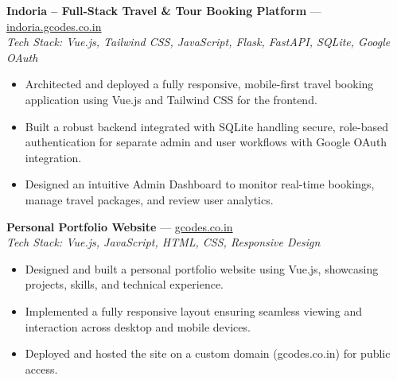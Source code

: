 \documentclass[10.5pt,a4paper]{article}
\begin{document}
\vspace{3pt}
\textbf{Indoria -- Full-Stack Travel \& Tour Booking Platform} --- \href{https://indoria.gcodes.co.in}{indoria.gcodes.co.in}\\
\textit{Tech Stack: Vue.js, Tailwind CSS, JavaScript, Flask, FastAPI, SQLite, Google OAuth}
\begin{itemize}[leftmargin=*, itemsep=1pt, topsep=1pt]
    \item Architected and deployed a fully responsive, mobile-first travel booking application using Vue.js and Tailwind CSS for the frontend.
    \item Built a robust backend integrated with SQLite handling secure, role-based authentication for separate admin and user workflows with Google OAuth integration.
    \item Designed an intuitive Admin Dashboard to monitor real-time bookings, manage travel packages, and review user analytics.
\end{itemize}

\vspace{3pt}
\textbf{Personal Portfolio Website} --- \href{https://gcodes.co.in}{gcodes.co.in}\\
\textit{Tech Stack: Vue.js, JavaScript, HTML, CSS, Responsive Design}
\begin{itemize}[leftmargin=*, itemsep=1pt, topsep=1pt]
    \item Designed and built a personal portfolio website using Vue.js, showcasing projects, skills, and technical experience.
    \item Implemented a fully responsive layout ensuring seamless viewing and interaction across desktop and mobile devices.
    \item Deployed and hosted the site on a custom domain (gcodes.co.in) for public access.
\end{itemize}
\end{document}
